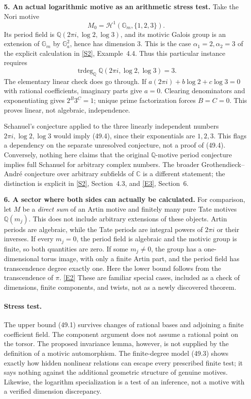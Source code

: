 \documentclass[11pt,a4paper]{article}
\newcommand{\Q}{\mathbb{Q}}
\newcommand{\C}{\mathbb{C}}
\newcommand{\sref}[2]{\hyperlink{source:#1:#2}{[S#2]}}
\newcommand{\eref}[2]{\hyperlink{extra:#1:#2}{[E#2]}}
\numberwithin{equation}{section}
\begin{document}
\textbf{5. An actual logarithmic motive as an arithmetic stress test.}
Take the Nori motive
\[
 M_0=\mathcal H^1(\mathbb G_m,\{1,2,3\}).
\]
Its period field is $\Q(2\pi i,\log2,\log3)$, and its motivic Galois
group is an extension of $\mathbb G_m$ by $\mathbb G_a^2$, hence has
dimension $3$. This is the case $\alpha_1=2,\alpha_2=3$ of the explicit
calculation in \sref{49}{2}, Example~4.4. Thus this particular instance
requires
\[
 \operatorname{trdeg}_{\Q}\Q(2\pi i,\log2,\log3)=3.
 \tag{49.4}
\]
The elementary linear check does go through. If
$a(2\pi i)+b\log2+c\log3=0$ with rational coefficients, imaginary parts
give $a=0$. Clearing denominators and exponentiating gives $2^B3^C=1$;
unique prime factorization forces $B=C=0$. This proves linear, not
algebraic, independence.

Schanuel's conjecture applied to the three linearly independent numbers
$2\pi i,\log2,\log3$ would imply (49.4), since their exponentials are
$1,2,3$. This flags a dependency on the separate unresolved conjecture,
not a proof of (49.4). Conversely, nothing here claims that the original
$\Q$-motive period conjecture implies full Schanuel for arbitrary complex
numbers. The broader Grothendieck--Andr\'e conjecture over arbitrary
subfields of $\C$ is a different statement; the distinction is explicit
in \sref{49}{2}, Section~4.3, and \eref{49}{3}, Section~6.

\textbf{6. A sector where both sides can actually be calculated.}
For comparison, let $M$ be a \emph{direct sum} of an Artin motive and
finitely many pure Tate motives $\Q(m_j)$. This does not include arbitrary
extensions of these objects. Artin periods are algebraic, while the Tate
periods are integral powers of $2\pi i$ or their inverses. If every
$m_j=0$, the period field is algebraic and the motivic group is finite,
so both quantities are zero. If some $m_j\ne0$, the group has a
one-dimensional torus image, with only a finite Artin part, and the period
field has transcendence degree exactly one. Here the lower bound follows
from the transcendence of $\pi$. \eref{49}{2}
These are familiar special cases, included as a check of dimensions,
finite components, and twists, not as a newly discovered theorem.

\paragraph{Stress test.}
The upper bound (49.1) survives changes of rational bases and adjoining a
finite coefficient field. The component argument does not assume a rational
point on the torsor. The proposed invariance lemma, however, is not supplied
by the definition of a motivic automorphism. The finite-degree model (49.3)
shows exactly how hidden nonlinear relations can escape every prescribed
finite test; it says nothing against the additional geometric structure
of genuine motives. Likewise, the logarithm specialization is a test of
an inference, not a motive with a verified dimension discrepancy.
\end{document}
